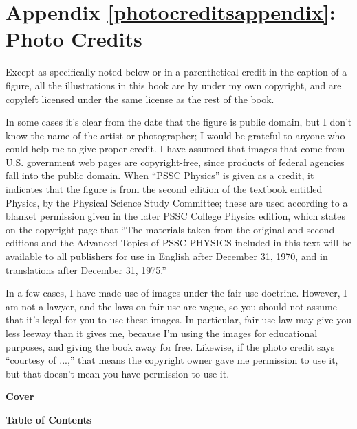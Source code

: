 
\label{photocreditsappendix}%
\appendix\chapter{Appendix \ref{photocreditsappendix}: Photo Credits}
Except as specifically noted below or in a parenthetical credit in the
caption of a figure, all the illustrations in this book are by
under my own copyright, and are copyleft licensed under the same license
as the rest of the book. 

In some cases it's clear from the date that the
figure is public domain, but I don't know the name of the artist or photographer; I would
be grateful to anyone who could help me to give proper credit.
I have assumed that images
that come from U.S. government web pages are copyright-free, since products
of federal agencies fall into the public domain.
When ``PSSC Physics'' is given as a credit, it indicates that the figure
is from the second edition of the textbook entitled Physics, by the
Physical Science Study Committee; these are used according to a blanket
permission given in the later PSSC College Physics edition, which states
on the copyright page that ``The materials taken from the original and second
editions and the Advanced Topics of PSSC PHYSICS included in this text
will be available to all publishers for use in English after December 31, 1970,
and in translations after December 31, 1975.'' 

In a few cases, I have made use of images under the fair use doctrine. However,
I am not a lawyer, and the laws on fair use are vague, so you should not assume
that it's legal for you to use these images. In particular, fair use law may
give you less leeway than it gives me, because I'm using the images for
educational purposes, and giving the book away for free. Likewise, if the
photo credit says ``courtesy of ...,'' that means the copyright owner gave
me permission to use it, but that doesn't mean you have permission to use it.

\begin{sloppypar}
\noindent
\textbf{Cover}
\end{sloppypar}

\begin{sloppypar}
\noindent
\textbf{Table of Contents}
\end{sloppypar}

